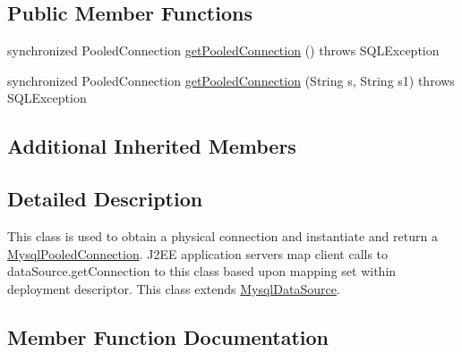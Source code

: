 \subsection*{Public Member Functions}
\begin{DoxyCompactItemize}
\item 
synchronized Pooled\+Connection \mbox{\hyperlink{classcom_1_1mysql_1_1jdbc_1_1jdbc2_1_1optional_1_1_mysql_connection_pool_data_source_a7ad70ccec5dcac093fe965c738ec484c}{get\+Pooled\+Connection}} ()  throws S\+Q\+L\+Exception 
\item 
synchronized Pooled\+Connection \mbox{\hyperlink{classcom_1_1mysql_1_1jdbc_1_1jdbc2_1_1optional_1_1_mysql_connection_pool_data_source_a282b26c4bae068ad0d89a550924b3a2c}{get\+Pooled\+Connection}} (String s, String s1)  throws S\+Q\+L\+Exception 
\end{DoxyCompactItemize}
\subsection*{Additional Inherited Members}


\subsection{Detailed Description}
This class is used to obtain a physical connection and instantiate and return a \mbox{\hyperlink{classcom_1_1mysql_1_1jdbc_1_1jdbc2_1_1optional_1_1_mysql_pooled_connection}{Mysql\+Pooled\+Connection}}. J2\+EE application servers map client calls to data\+Source.\+get\+Connection to this class based upon mapping set within deployment descriptor. This class extends \mbox{\hyperlink{classcom_1_1mysql_1_1jdbc_1_1jdbc2_1_1optional_1_1_mysql_data_source}{Mysql\+Data\+Source}}. 

\subsection{Member Function Documentation}
\mbox{\label{classcom_1_1mysql_1_1jdbc_1_1jdbc2_1_1optional_1_1_mysql_connection_pool_data_source_a7ad70ccec5dcac093fe965c738ec484c}} 
